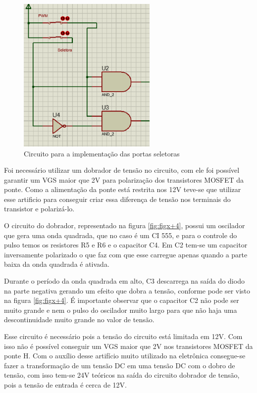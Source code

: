 			\begin{figure}[!h]
				\center
				\includegraphics[width=0.6\textwidth]{figuras/resultados/circuito_seletora}
				\caption{Circuito para a implementação das portas seletoras}
				\label{fig:circuito_seletora}
			\end{figure}

			Foi necessário utilizar um dobrador de tensão no circuito, com ele foi possível garantir um VGS maior que 2V para polarização dos transistores MOSFET da ponte. Como a alimentação da ponte está restrita nos 12V teve-se que utilizar esse artificio para conseguir criar essa diferença de tensão nos terminais do transistor e polarizá-lo.

			O circuito do dobrador, representado na figura \ref{fig:figx+4}, possui um oscilador que gera uma onda quadrada, que no caso é um CI 555, e para o controle do pulso temos os resistores R5 e R6 e o capacitor C4. Em C2 tem-se um capacitor inversamente polarizado o que faz com que esse carregue apenas quando a parte baixa da onda quadrada é ativada.

			Durante o período da onda quadrada em alto, C3 descarrega na saída do diodo na parte negativa gerando um efeito que dobra a tensão, conforme pode ser visto na figura \ref{fig:figx+4}. É importante observar que o capacitor C2 não pode ser muito grande e nem o pulso do oscilador muito largo para que não haja uma descontinuidade muito grande no valor de tensão.

			Esse circuito é necessário pois a tensão do circuito está limitada em 12V. Com isso não é possível conseguir um VGS maior que 2V nos transistores MOSFET da ponte H. Com o auxílio desse artifício muito utilizado na eletrônica consegue-se fazer a transformação de um tensão DC em uma tensão DC com o dobro de tensão, com isso tem-se 24V teóricos na saída do circuito dobrador de tensão, pois a tensão de entrada é cerca de 12V.

